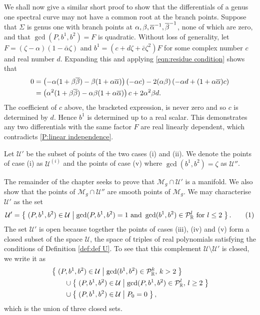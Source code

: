 \documentclass{article}
\begin{document}
We shall now give a similar short proof to show that the differentials of a genus one spectral curve may not have a common root at the branch points. Suppose that $\Sigma$ is genus one with branch points at $\alpha,\beta,\overline{\alpha}^{-1},\overline{\beta}^{-1}$, none of which are zero, and that $\gcd(P,b^1,b^2) = F$ is quadratic. Without loss of generality, let $F = (\zeta-\alpha)(1-\bar{\alpha}\zeta)$ and $b^1 = (c + d\zeta + \bar{c}\zeta^2)F$ for some complex number $c$ and real number $d$. Expanding this and applying \eqref{eqn:residue condition} shows that
\begin{align*}
0 &= \left( -\alpha(1+\beta\overline{\beta}) - \beta(1+\alpha\overline{\alpha}) \right)(-\alpha c) - 2(\alpha\beta)\left(-\alpha d + (1+\alpha\overline{\alpha})c\right)\\
&= \left( \alpha^2(1+\beta\overline{\beta}) - \alpha\beta(1+\alpha\overline{\alpha}) \right)c + 2\alpha^2\beta d.
\end{align*}
The coefficient of $c$ above, the bracketed expression, is never zero and so $c$ is determined by $d$. Hence $b^1$ is determined up to a real scalar. This demonstrates any two differentials with the same factor $F$ are real linearly dependent, which contradicts \ref{P:linear independence}.

\begin{defn}
\label{def:subsets U}
Let $\mathcal{U}'$ be the subset of points of the two cases (i) and (ii).
We denote the points of case (i) as $\mathcal{U}^{(i)}$ and the points of case (v) where $\gcd(b^1,b^2) = \zeta$ as $\mathcal{U}''$.
\end{defn}

The remainder of the chapter seeks to prove that $\mathcal{M}_g \cap \mathcal{U}'$ is a manifold. We also show that the points of $\mathcal{M}_g\cap \mathcal{U}''$ are smooth points of $\mathcal{M}_g$.
We may characterise $\mathcal{U}'$ as the set
\[
\mathcal{U}' = \Set{ (P,b^1,b^2) \in \mathcal{U} } { \gcd(P,b^1,b^2) = 1 \text{ and } \gcd(b^1,b^2) \in \mathcal{P}^l_\R \text{ for } l \leq 2 }.
\labelthis{eqn:def U'}
\]
The set $\mathcal{U}'$ is open because together the points of cases (iii), (iv) and (v) form a closed subset of the space $\mathcal{U}$, the space of triples of real polynomials satisfying the conditions of Definition \ref{def:def U}. To see that this complement $\mathcal{U}\setminus \mathcal{U}'$ is closed, we write it as
\begin{align*}
&\left\{\; (P,b^1,b^2) \in \mathcal{U} \;\middle|\;  \gcd(b^1,b^2) \in\mathcal{P}^k_{\mathbb{R}},\,k > 2  \;\right\} \\
&\qquad\cup
\left\{\; (P,b^1,b^2) \in \mathcal{U} \;\middle|\;  \gcd(P,b^1,b^2) \in\mathcal{P}^l_{\mathbb{R}},\,l \geq 2  \;\right\} \\
&\qquad\cup
\left\{\; (P,b^1,b^2) \in \mathcal{U} \;\middle|\;  P_0 = 0  \;\right\},
\end{align*}
which is the union of three closed sets.
\end{document}

